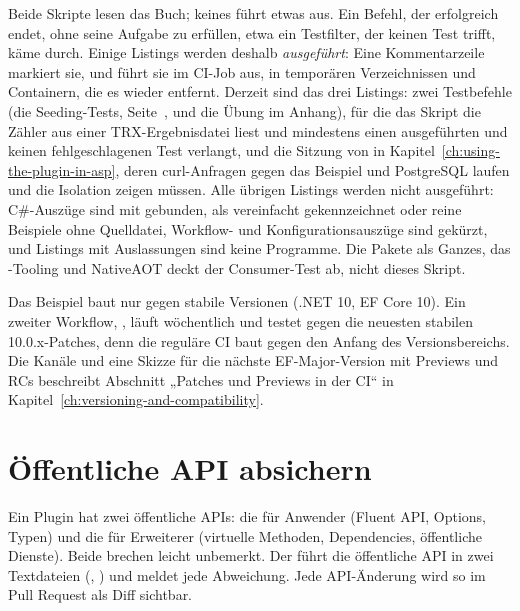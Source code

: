 Beide Skripte lesen das Buch; keines führt etwas aus. Ein Befehl, der erfolgreich endet, ohne
seine Aufgabe zu erfüllen, etwa ein Testfilter, der keinen Test trifft, käme durch. Einige
Listings werden deshalb \emph{ausgeführt}: Eine Kommentarzeile  markiert
sie, und  führt sie im CI-Job
 aus, in temporären Verzeichnissen und Containern, die es
wieder entfernt. Derzeit sind das drei Listings: zwei Testbefehle (die Seeding-Tests,
Seite~\pageref{sec:seeding-under-rls}, und die Übung im Anhang), für die das Skript die Zähler aus einer TRX-Ergebnisdatei liest und mindestens einen ausgeführten und keinen
fehlgeschlagenen Test verlangt, und die Sitzung von  in
Kapitel~\ref{ch:using-the-plugin-in-asp}, deren curl-Anfragen gegen das Beispiel und PostgreSQL
laufen und die Isolation zeigen müssen. Alle übrigen Listings werden nicht ausgeführt:
C\#-Auszüge sind mit  gebunden, als vereinfacht gekennzeichnet oder reine
Beispiele ohne Quelldatei, Workflow-
und Konfigurationsauszüge sind gekürzt, und Listings mit Auslassungen sind keine Programme. Die
Pakete als Ganzes, das -Tooling und NativeAOT deckt der Consumer-Test ab, nicht
dieses Skript.

Das Beispiel baut nur gegen stabile Versionen (.NET 10, EF Core 10). Ein zweiter Workflow,
, läuft wöchentlich und testet gegen die neuesten
stabilen 10.0.x-Patches, denn die reguläre CI baut gegen den Anfang des Versionsbereichs. Die
Kanäle und eine Skizze für die nächste EF-Major-Version mit Previews und RCs beschreibt
Abschnitt „Patches und Previews in der CI“ in Kapitel~\ref{ch:versioning-and-compatibility}.

\section{Öffentliche API absichern}

Ein Plugin hat zwei öffentliche APIs: die für Anwender (Fluent API, Options, Typen) und die
für Erweiterer (virtuelle Methoden, Dependencies, öffentliche Dienste). Beide brechen leicht
unbemerkt. Der
führt die öffentliche API in zwei Textdateien
(,
) und meldet jede
Abweichung. Jede API-Änderung wird so im Pull Request als Diff sichtbar.

